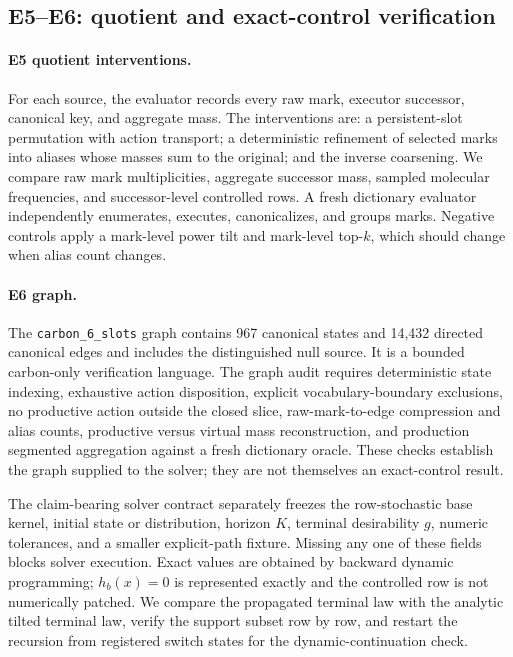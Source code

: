 \subsection{E5--E6: quotient and exact-control verification}
\label{app:e5-e6-protocols}

\paragraph{E5 quotient interventions.}
For each source, the evaluator records every raw mark, executor successor,
canonical key, and aggregate mass.  The interventions are: a persistent-slot
permutation with action transport; a deterministic refinement of selected
marks into aliases whose masses sum to the original; and the inverse
coarsening.  We compare raw mark multiplicities, aggregate successor mass,
sampled molecular frequencies, and successor-level controlled rows.  A fresh
dictionary evaluator independently enumerates, executes, canonicalizes, and
groups marks.  Negative controls apply a mark-level power tilt and mark-level
top-$k$, which should change when alias count changes.

\paragraph{E6 graph.}
The \texttt{carbon\_6\_slots} graph contains 967 canonical states and 14,432
directed canonical edges and includes the distinguished null source.  It is a
bounded carbon-only verification language.  The graph audit requires
deterministic state indexing, exhaustive action disposition, explicit
vocabulary-boundary exclusions, no productive action outside the closed
slice, raw-mark-to-edge compression and alias counts, productive versus
virtual mass reconstruction, and production segmented aggregation against a
fresh dictionary oracle.  These checks establish the graph supplied to the
solver; they are not themselves an exact-control result.

The claim-bearing solver contract separately freezes the row-stochastic base
kernel, initial state or distribution, horizon $K$, terminal desirability
$g$, numeric tolerances, and a smaller explicit-path fixture.  Missing any one
of these fields blocks solver execution.  Exact values are obtained by
backward dynamic programming; $h_b(x)=0$ is represented exactly and the
controlled row is not numerically patched.  We compare the propagated
terminal law with the analytic tilted terminal law, verify the support subset
row by row, and restart the recursion from registered switch states for the
dynamic-continuation check.

